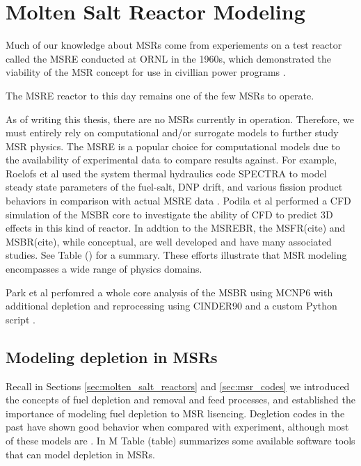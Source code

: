 \chapter{Molten Salt Reactor Modeling}%
\label{cha:msr_modeling}
Much of our knowledge about \Gls{MSR}s come from experiements on a test reactor called the \Gls{MSRE} conducted at \Gls{ORNL} in the 1960s, which demonstrated the viability of the \Gls{MSR} concept for use in civillian power programs \cite{haubenreich_experience_1970} \cite{rosenthal_molten-salt_1970}.

The \Gls{MSRE} reactor to this day remains one of the few \Gls{MSR}s to operate.

As of writing this thesis, there are no \Gls{MSR}s currently in operation. Therefore, we must entirely rely on computational and/or surrogate models to further study \Gls{MSR} physics. The \Gls{MSRE} is a popular choice for computational models due to the availability of experimental data to compare results against. For example, Roelofs et al used the system thermal hydraulics code SPECTRA to model steady state parameters of the fuel-salt, \Gls{DNP} drift, and various fission product behaviors
in comparison with actual MSRE data \cite{roelofs_molten_2021}.  Podila et al performed a \Gls{CFD} simulation of the \Gls{MSBR} core to investigate the ability of \Gls{CFD} to predict 3D effects in this kind of reactor\cite{podila_cfd_2019}. 
In addtion to the \Gls{MSREBR}, the \Gls{MSFR}(cite) and \Gls{MSBR}(cite), while conceptual, are well developed and have many associated studies. See Table () for a summary. These efforts illustrate that \Gls{MSR} modeling encompasses a wide range of physics domains.

Park et al perfomred a whole core analysis of the \Gls{MSBR} using MCNP6 with additional depletion and reprocessing using CINDER90 and a custom Python script \cite{park_whole_2015}.

\section{Modeling depletion in \Gls{MSR}s}
Recall in Sections
\ref{sec:molten_salt_reactors} and \ref{sec:msr_codes} we introduced the concepts of fuel depletion and removal and feed processes, and established the importance of modeling fuel depletion to \Gls{MSR} lisencing. Degletion codes in the past have shown good behavior when compared with experiment, although most of these models are . In M Table (table) summarizes some available software tools that can model depletion in \Gls{MSR}s.

